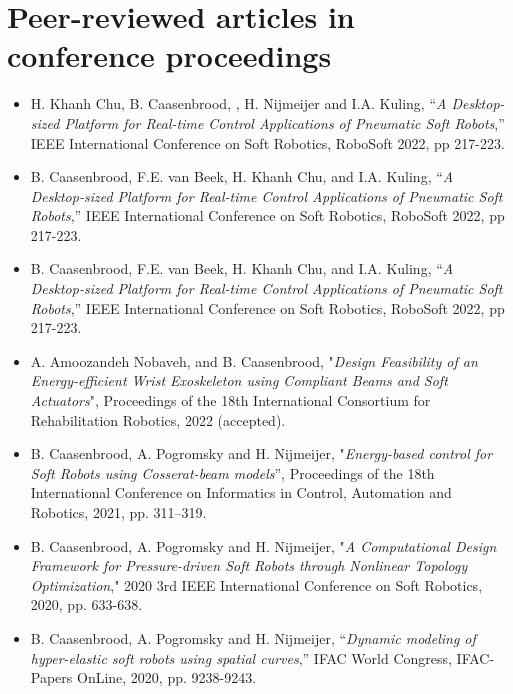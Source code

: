 \section*{Peer-reviewed articles in conference proceedings}
\begin{itemize}[leftmargin=4mm]
\item H. Khanh Chu, B. Caasenbrood, , H. Nijmeijer and I.A. Kuling, “\textit{A Desktop-sized Platform for Real-time Control Applications of Pneumatic Soft Robots},” IEEE International Conference on Soft Robotics, RoboSoft 2022, pp 217-223.  
\item B. Caasenbrood, F.E. van Beek, H. Khanh Chu, and I.A. Kuling, “\textit{A Desktop-sized Platform for Real-time Control Applications of Pneumatic Soft Robots},” IEEE International Conference on Soft Robotics, RoboSoft 2022, pp 217-223.
\item B. Caasenbrood, F.E. van Beek, H. Khanh Chu, and I.A. Kuling, “\textit{A Desktop-sized Platform for Real-time Control Applications of Pneumatic Soft Robots},” IEEE International Conference on Soft Robotics, RoboSoft 2022, pp 217-223.
\item A. Amoozandeh Nobaveh, and B. Caasenbrood, "\textit{Design Feasibility of an Energy-efficient Wrist Exoskeleton
using Compliant Beams and Soft Actuators}", Proceedings of the 18th International  Consortium for Rehabilitation Robotics, 2022 (accepted).
\item B. Caasenbrood, A. Pogromsky and H. Nijmeijer, "\textit{Energy-based control for Soft Robots using Cosserat-beam models}”, Proceedings of the 18th International Conference on Informatics in Control, Automation and Robotics, 2021, pp. 311–319.
\item B. Caasenbrood, A. Pogromsky and H. Nijmeijer, "\textit{A Computational Design Framework for Pressure-driven Soft Robots through Nonlinear Topology Optimization}," 2020 3rd IEEE International Conference on Soft Robotics, 2020, pp. 633-638.
\item B. Caasenbrood, A. Pogromsky and H. Nijmeijer, “\textit{Dynamic modeling of hyper-elastic soft robots using spatial curves},” IFAC World Congress, IFAC-Papers OnLine, 2020, pp. 9238-9243.
\end{itemize}

